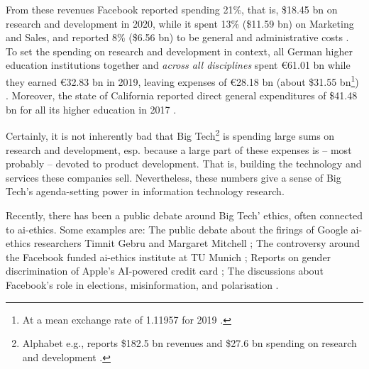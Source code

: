 From these revenues Facebook reported spending 21\%, that is, \$18.45 \gls{bn} on research and development in 2020, while it spent 13\% (\$11.59 \gls{bn}) on Marketing and Sales, and reported 8\% (\$6.56 \gls{bn}) to be general and administrative costs \citep{facebook_annual_2021}.
To set the spending on research and development in context, all German higher education institutions together and \textit{across all disciplines} spent €61.01 \gls{bn} while they earned €32.83 \gls{bn} in 2019, leaving expenses of €28.18 \gls{bn} (about \$31.55 \gls{bn}\footnote{At a mean exchange rate of 1.11957 for 2019 \citep{estv_jahresmittelkurse_2021} .}) \citep{statistisches_bundesamt_ausgaben_2021, statistisches_bundesamt_einnahmen_2021}. 
Moreover, the state of California reported direct general expenditures of \$41.48 \gls{bn} for all its higher education in 2017 \citep{duffin_us_2020}.

Certainly, it is not inherently bad that Big Tech\footnote{Alphabet e.g., reports \$182.5 \gls{bn} revenues and \$27.6 \gls{bn} spending on research and development \citep{alphabet_inc_annual_2021}.} is spending large sums on research and development, esp. because a large part of these expenses is -- most probably -- devoted to product development. 
That is, building the technology and services these companies sell.
Nevertheless, these numbers give a sense of Big Tech's agenda-setting power in information technology research.

Recently, there has been a public debate around Big Tech' ethics, often connected to \gls{ai}-ethics.
Some examples are: The public debate about the firings of Google \gls{ai}-ethics researchers Timnit Gebru and Margaret Mitchell \citep{timnit_gebru_i_2020, simonite_prominent_2020, agency_google_2021, noauthor_margaret_2021}; 
The controversy around the Facebook funded \gls{ai}-ethics institute at TU Munich \citep{kover_warum_2019, kreiss_vielsagender_2019, kreye_facebook_2019, hauck_facebook_2019, thiel_kommentar_2019};
Reports on gender discrimination of Apple's AI-powered credit card \citep{heinemeier_hansson_dhh_2019, vigdor_apple_2019, hegemann_apple_2019, mahdawi_apples_2019};
The discussions about Facebook's role in elections, misinformation, and polarisation \citep{kates_facebook_2017, rosen_smart_2019, klein_what_2020, boxell_cross-country_2020, newton_how_2020, seetharaman_facebook_2020}.

